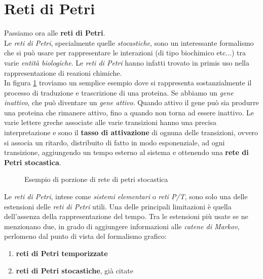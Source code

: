\documentclass[a4paper,12pt, oneside]{book}
\begin{document}
\section{Reti di Petri}
Passiamo ora alle \textbf{reti di Petri}.\\
Le \textit{reti di Petri}, specialmente quelle \textit{stocastiche}, sono un
interessante formalismo che si può usare per rappresentare le interazioni (di
tipo biochimico etc$\ldots$) tra varie \textit{entità biologiche}. Le
\textit{reti di Petri} hanno infatti trovato in primis uso nella
rappresentazione di reazioni chimiche.\\
In figura \ref{fig:pet1} troviamo un semplice esempio dove si rappresenta
sostanzialmente il processo di traduzione e trascrizione di una proteina. Se
abbiamo un \textit{gene inattivo}, che può diventare un \textit{gene
  attivo}. Quando attivo il gene può sia produrre una proteina che rimanere
attivo, fino a quando non torna ad essere inattivo. Le varie lettere greche
associate alle varie transizioni hanno una precisa interpretazione e sono il
\textbf{tasso di attivazione} di ognuna delle transizioni, ovvero si associa un
ritardo, distribuito di fatto in modo esponenziale, ad ogni transizione,
aggiungendo un tempo esterno al sistema e ottenendo una \textbf{rete di Petri
  stocastica}. 
\begin{figure}
  \centering
  \caption{Esempio di porzione di rete di petri stocastica}
  \label{fig:pet1}
\end{figure}
Le \textit{reti di Petri}, intese come \textit{sistemi elementari} o
\textit{reti P/T}, sono solo una delle estensioni delle
\textit{reti di Petri} utili. Una delle principali limitazioni è quella
dell'assenza della rappresentazione del tempo. Tra le estensioni più usate se ne
menzionano due, 
in grado di aggiungere informazioni alle \textit{catene di Markov}, perlomeno
dal punto di vista del formalismo grafico:
\begin{enumerate}
  \item \textbf{reti di Petri temporizzate}
  \item \textbf{reti di Petri stocastiche}, già citate
\end{enumerate}
\end{document}
